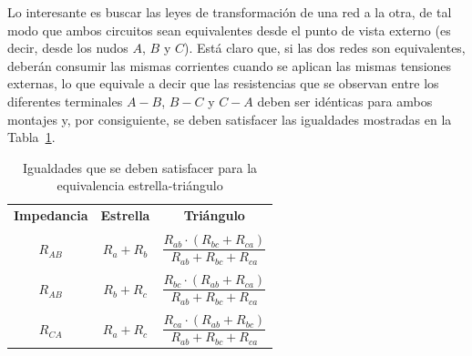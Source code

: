 \documentclass[11pt]{book} %
\begin{document}
	Lo interesante es buscar las leyes de transformación de una red a la otra, de tal modo que ambos circuitos sean equivalentes desde el punto de vista externo (es decir,
	desde los nudos $A$, $B$ y $C$). Está claro que, si las dos redes son equivalentes, deberán consumir las mismas
	corrientes cuando se aplican las mismas tensiones externas, lo que equivale a decir que las resistencias que se observan entre los diferentes terminales $A-B$, $B-C$ y $C-A$ deben ser idénticas para ambos montajes y, por consiguiente, se
	deben satisfacer las igualdades mostradas en la Tabla~\ref{tab.igualdades_estrellatriangulo}. 
	\begin{table}[htbp]
		\centering
		\begin{tabular}{c|c|c}
			\rowcolor{ocre!50} \textbf{Impedancia} & \textbf{Estrella} & \textbf{Triángulo}\\
			&&        \\[-0.75em]
			$R_{AB}$ & $R_a+R_b$ & $\dfrac{R_{ab} \cdot (R_{bc} + R_{ca})}{R_{ab} + R_{bc} + R_{ca}}$\\
			&&         \\[-0.75em]
			$R_{AB}$ & $R_b+R_c$ & $\dfrac{R_{bc} \cdot (R_{ab} + R_{ca})}{R_{ab} + R_{bc} + R_{ca}}$\\
			&& \\[-0.75em]
			$R_{CA}$ & $R_a+R_c$ & $\dfrac{R_{ca} \cdot (R_{ab} + R_{bc})}{R_{ab} + R_{bc} + R_{ca}}$\\
		\end{tabular}
		\caption{Igualdades que se deben satisfacer para la equivalencia estrella-triángulo}
		\label{tab.igualdades_estrellatriangulo}
	\end{table}
	
\end{document}
